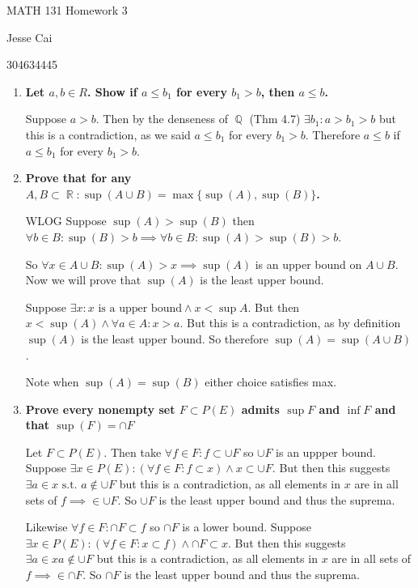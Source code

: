 \documentclass[10pt,a4paper]{article}
\DeclareMathOperator*{\R}{\mathbb{R}}
\DeclareMathOperator*{\Q}{\mathbb{Q}}
\begin{document}
MATH 131 Homework 3

Jesse Cai

304634445

\begin{enumerate}
    \item \textbf{Let $a, b \in R$. Show if $a \leq b_1$ for every $b_1 > b$, then $a \leq b$.}

        Suppose $a > b$. Then by the denseness of $\Q$ (Thm 4.7) $\exists b_1 : a > b_1> b$ but this is a contradiction, as we said $a \leq b_1$ for every $b_1 > b$. Therefore $ a \leq b$ if $a \leq b_1$ for every $b_1 > b$.

    \item \textbf{Prove that for any $A,B \subset \R: \sup(A\cup B) = \max \{\sup(A), \sup(B)\}$.}

        WLOG Suppose $\sup(A) > \sup(B)$ then $\forall b \in B: \sup(B) > b \implies \forall b \in B: \sup(A) > \sup(B) > b$.
        
        So $\forall x \in A\cup B: \sup(A) > x \implies \sup(A)$ is an upper bound on $A \cup B$. Now we will prove that $\sup(A)$ is the least upper bound. 

        Suppose $\exists x : x \text{ is a upper bound} \land x < \sup A$. But then $x < \sup(A) \land \forall a \in A: x > a$. But this is a contradiction, as by definition $\sup(A)$ is the least upper bound. So therefore $\sup(A) = \sup (A\cup B)$.

        Note when $\sup(A) = \sup(B)$ either choice satisfies max.

    \item \textbf{Prove every nonempty set $F \subset P(E)$ admits $\sup F $ and $\inf F$ and that $\sup(F) = \cap F$}

        Let $F \subset P(E)$. Then take $\forall f \in F:  f \subset \cup F$ so $\cup F$ is an uppper bound. Suppose $\exists x \in P(E): (\forall f \in F: f\subset x) \land x \subset \cup F$. 
        But then this suggests $\exists a \in x  \text{ s.t. } a \not\in \cup F$ but this is a contradiction, as all elements in $x$ are in all sets of $f \implies \in \cup F$. So $\cup F$ is the least upper bound and thus the suprema.

        Likewise $\forall f \in F: \cap F \subset f$ so $\cap F$ is a lower bound. Suppose $\exists x \in P(E): (\forall f \in F: x \subset f) \land \cap F \subset x$. 
        But then this suggests $\exists a \in x a \not\in \cup F$ but this is a contradiction, as all elements in $x$ are in all sets of $f \implies \in \cap F$. So $\cap F$ is the least upper bound and thus the suprema.


\end{enumerate}
\end{document}
